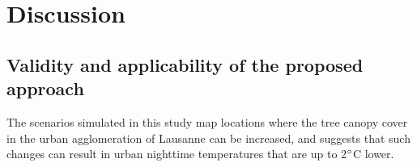 \documentclass[10pt,letterpaper]{article}
\begin{document}
\section*{Discussion}

\subsection*{Validity and applicability of the proposed approach}

The scenarios simulated in this study map locations where the tree canopy cover in the urban agglomeration of Lausanne can be increased, and suggests that such changes can result in urban nighttime temperatures that are up to 2$\degree$C lower.
\end{document}
